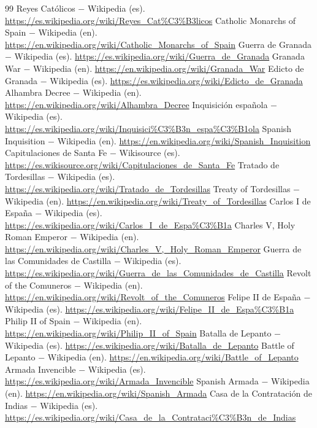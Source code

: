 \documentclass{book}
\begin{document}
\begin{thebibliography}{99}
 Reyes Católicos \(-\) Wikipedia (es). \url{https://es.wikipedia.org/wiki/Reyes_Cat%C3%B3licos}
 Catholic Monarchs of Spain \(-\) Wikipedia (en). \url{https://en.wikipedia.org/wiki/Catholic_Monarchs_of_Spain}
 Guerra de Granada \(-\) Wikipedia (es). \url{https://es.wikipedia.org/wiki/Guerra_de_Granada}
 Granada War \(-\) Wikipedia (en). \url{https://en.wikipedia.org/wiki/Granada_War}
 Edicto de Granada \(-\) Wikipedia (es). \url{https://es.wikipedia.org/wiki/Edicto_de_Granada}
 Alhambra Decree \(-\) Wikipedia (en). \url{https://en.wikipedia.org/wiki/Alhambra_Decree}
 Inquisición española \(-\) Wikipedia (es). \url{https://es.wikipedia.org/wiki/Inquisici%C3%B3n_espa%C3%B1ola}
 Spanish Inquisition \(-\) Wikipedia (en). \url{https://en.wikipedia.org/wiki/Spanish_Inquisition}
 Capitulaciones de Santa Fe \(-\) Wikisource (es). \url{https://es.wikisource.org/wiki/Capitulaciones_de_Santa_Fe}
 Tratado de Tordesillas \(-\) Wikipedia (es). \url{https://es.wikipedia.org/wiki/Tratado_de_Tordesillas}
 Treaty of Tordesillas \(-\) Wikipedia (en). \url{https://en.wikipedia.org/wiki/Treaty_of_Tordesillas}
 Carlos I de España \(-\) Wikipedia (es). \url{https://es.wikipedia.org/wiki/Carlos_I_de_Espa%C3%B1a}
 Charles V, Holy Roman Emperor \(-\) Wikipedia (en). \url{https://en.wikipedia.org/wiki/Charles_V,_Holy_Roman_Emperor}
 Guerra de las Comunidades de Castilla \(-\) Wikipedia (es). \url{https://es.wikipedia.org/wiki/Guerra_de_las_Comunidades_de_Castilla}
 Revolt of the Comuneros \(-\) Wikipedia (en). \url{https://en.wikipedia.org/wiki/Revolt_of_the_Comuneros}
 Felipe II de España \(-\) Wikipedia (es). \url{https://es.wikipedia.org/wiki/Felipe_II_de_Espa%C3%B1a}
 Philip II of Spain \(-\) Wikipedia (en). \url{https://en.wikipedia.org/wiki/Philip_II_of_Spain}
 Batalla de Lepanto \(-\) Wikipedia (es). \url{https://es.wikipedia.org/wiki/Batalla_de_Lepanto}
 Battle of Lepanto \(-\) Wikipedia (en). \url{https://en.wikipedia.org/wiki/Battle_of_Lepanto}
 Armada Invencible \(-\) Wikipedia (es). \url{https://es.wikipedia.org/wiki/Armada_Invencible}
 Spanish Armada \(-\) Wikipedia (en). \url{https://en.wikipedia.org/wiki/Spanish_Armada}
 Casa de la Contratación de Indias \(-\) Wikipedia (es). \url{https://es.wikipedia.org/wiki/Casa_de_la_Contrataci%C3%B3n_de_Indias}

\end{thebibliography}
\end{document}
